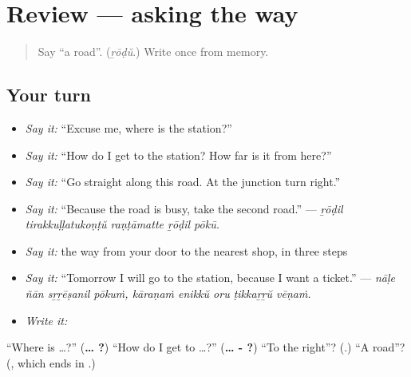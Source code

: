 \section[(review)]{Review — asking the way}

\label{lesson:ML-R343-asking-the-way}



\begin{quote}
Say \textquotedblleft{}a road\textquotedblright{}. (\emph{ṟōḍŭ}.) Write \textbf{} once from memory.
\end{quote}

\subsection*{Your turn}
\begin{itemize}
\raggedright
  \item \emph{Say it:} \textquotedblleft{}Excuse me, where is the station?\textquotedblright{}
  \item \emph{Say it:} \textquotedblleft{}How do I get to the station? How far is it from here?\textquotedblright{}
  \item \emph{Say it:} \textquotedblleft{}Go straight along this road. At the junction turn right.\textquotedblright{}
  \item \emph{Say it:} \textquotedblleft{}Because the road is busy, take the second road.\textquotedblright{} — \emph{ṟōḍil tirakkuḷḷatukoṇṭŭ raṇṭāmatte ṟōḍil pōkū.}
  \item \emph{Say it:} the way from your door to the nearest shop, in three steps
  \item \emph{Say it:} \textquotedblleft{}Tomorrow I will go to the station, because I want a ticket.\textquotedblright{} — \emph{nāḷe ñān sṟṟēṣanil pōkuṁ, kāraṇaṁ enikkŭ oru ṭikkaṟṟŭ vēṇaṁ.}
  \item \emph{Write it:} \textbf{}
\end{itemize}

\begin{tcolorbox}[breakable,colback=teal!4,colframe=teal!35!black,title={Before you move on}]
\textquotedblleft{}Where is …?\textquotedblright{} (\textbf{… ?}) \textquotedblleft{}How do I get to …?\textquotedblright{} (\textbf{… -  ?}) \textquotedblleft{}To the right\textquotedblright{}? (\textbf{}.) \textquotedblleft{}A road\textquotedblright{}? (\textbf{}, which ends in \textbf{}.)
\end{tcolorbox}
